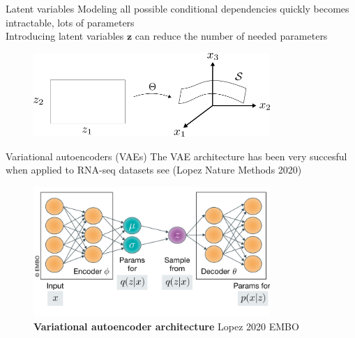 \documentclass[aspectratio=1610]{beamer}					%
\begin{document}
\begin{frame}{Latent variables}
Modeling all possible conditional dependencies quickly becomes intractable, lots of parameters\\
\vspace{0.2in}
Introducing latent variables $\bm{z}$ can reduce the number of needed parameters\\
\vspace{0.2in}

\begin{figure}
\includegraphics[width=0.8\textwidth]{manifold.png}
\end{figure}

\end{frame}


\begin{frame}{Variational autoencoders (VAEs)}
The VAE architecture has been very succesful when applied to RNA-seq datasets see (Lopez Nature Methods 2020)

\begin{center}
\begin{figure}
\includegraphics[width=0.8\textwidth]{vae}
\caption{\textbf{Variational autoencoder architecture} Lopez 2020 EMBO}
\end{figure}
\end{center}
\end{frame}
\end{document}
